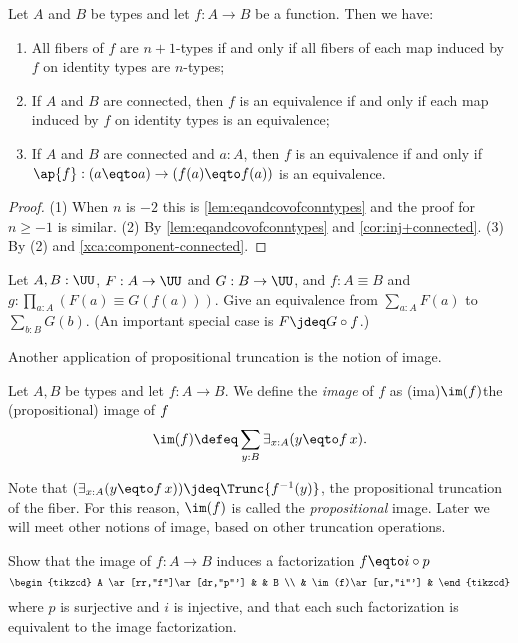 \begin{corollary}\label{cor:fib-vs-path}
Let $A$ and $B$ be types and let $f:A\to B$ be a function. Then we have:
\begin{enumerate}
\item\label{set-fib-vs-path}
All fibers of $f$ are $n+1$-types if and only if all fibers of 
each map induced by $f$ on identity types are $n$-types;
\item\label{conn-fib-vs-path}
If $A$ and $B$ are connected, then $f$ is an equivalence
if and only if each map induced by $f$ on identity types is an equivalence;
\item\label{conn-fib-vs-path-point}
If $A$ and $B$ are connected and $a:A$, then $f$ is an equivalence
if and only if $\ap{f}: (a \eqto a) \to (f(a) \eqto f(a))$ is an equivalence.
\end{enumerate}
\end{corollary}
\begin{proof}
(1) When $n$ is $-2$ this is \cref{lem:eqandcovofconntypes}
and the proof for $n\geq -1$ is similar.
(2) By \cref{lem:eqandcovofconntypes} and \cref{cor:inj+connected}.
(3) By (2) and \cref{xca:component-connected}.
\end{proof}

\begin{xca}\label{xca:sum-equivalences}
Let $A,B:\UU$, $F:A\to\UU$ and $G:B\to\UU$,
and $f: A\equiv B$ and $g:\prod_{a:A}(F(a) \equiv G(f(a)))$.
Give an equivalence from $\sum_{a:A} F(a)$ to $\sum_{b:B} G(b)$.
(An important special case is $F\jdeq G\circ f$.)
\end{xca}

Another application of propositional truncation
is the notion of image.
\begin{definition}\label{def:prop-image}
  Let $A,B$ be types and let $f : A \to B$. We define the \emph{image} of $f$ as
  \glossary(ima){$\protect\im(f)$}{the (propositional) image of $\protect f$}
  \[
    \im(f) \defeq \sum_{y:B}\exists_{x:A}(y \eqto f\,x).\qedhere
  \]
\end{definition}

Note that $(\exists_{x:A}(y \eqto f\,x)) \jdeq \Trunc{f^{-1}(y)}$,
the propositional truncation of the fiber.
For this reason, $\im(f)$ is called the \emph{propositional} image.
Later we will meet other notions of image, based on other truncation operations.

\begin{xca}\label{xca:unique-fact-image}
  Show that the image of $f : A \to B$ induces a factorization $f \eqto i\circ p$
  \[
    \begin{tikzcd}
      A \ar[rr,"f"]\ar[dr,"p"'] & & B \\
      & \im(f)\ar[ur,"i"'] &
    \end{tikzcd}
  \]
  where $p$ is surjective and $i$ is injective, and that each such factorization
  is equivalent to the image factorization.
\end{xca}


